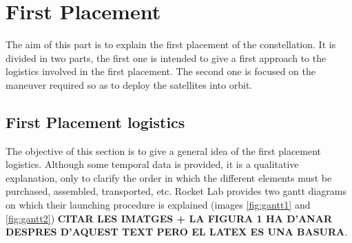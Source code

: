 
\section{First Placement}
The aim of this part is to explain the first placement of the constellation. It is divided in two parts, the first one is intended to give a first approach to the logistics involved in the first placement. The second one is focused on the maneuver required so as to deploy the satellites into orbit. 
\subsection{First Placement logistics}
The objective of this section is to give a general idea of the first placement logistics. Although some temporal data is provided, it is a qualitative explanation, only to clarify the order in which the different elements must be purchased, assembled, transported, etc. %
Rocket Lab provides two gantt diagrams on which their launching procedure is explained (images \ref{fig:gantt1} and \ref{fig:gantt2}) \textbf{CITAR LES IMATGES + LA FIGURA 1 HA D'ANAR DESPRES D'AQUEST TEXT PERO EL LATEX ES UNA BASURA}. 
\newline
